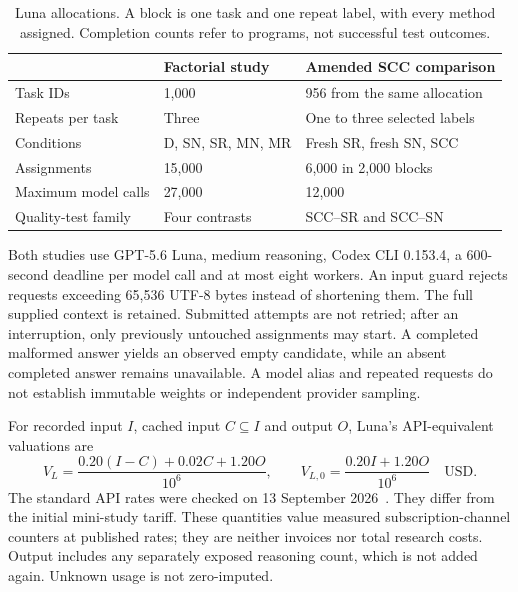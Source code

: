 \begin{table}[htbp]\centering\small
\caption{Luna allocations. A block is one task and one repeat label, with every method assigned. Completion counts refer to programs, not successful test outcomes.}
\begin{tabularx}{\textwidth}{@{}lXX@{}}\toprule
 & Factorial study & Amended SCC comparison\\\midrule
Task IDs & 1,000 & 956 from the same allocation\\
Repeats per task & Three & One to three selected labels\\
Conditions & D, SN, SR, MN, MR & Fresh SR, fresh SN, SCC\\
Assignments & 15,000 & 6,000 in 2,000 blocks\\
Maximum model calls & 27,000 & 12,000\\
Quality-test family & Four contrasts & SCC--SR and SCC--SN\\\bottomrule
\end{tabularx}\end{table}

Both studies use GPT-5.6 Luna, medium reasoning, Codex CLI 0.153.4, a 600-second deadline per model call and at most eight workers. An input guard rejects requests exceeding 65,536 UTF-8 bytes instead of shortening them. The full supplied context is retained. Submitted attempts are not retried; after an interruption, only previously untouched assignments may start. A completed malformed answer yields an observed empty candidate, while an absent completed answer remains unavailable. A model alias and repeated requests do not establish immutable weights or independent provider sampling.

For recorded input $I$, cached input $C\subseteq I$ and output $O$, Luna's API-equivalent valuations are
\[
V_L=\frac{0.20(I-C)+0.02C+1.20O}{10^6},\qquad
V_{L,0}=\frac{0.20I+1.20O}{10^6}\quad\mathrm{USD}.
\]
The standard API rates were checked on 13 September 2026~\cite{openaipricing2026}. They differ from the initial mini-study tariff. These quantities value measured subscription-channel counters at published rates; they are neither invoices nor total research costs. Output includes any separately exposed reasoning count, which is not added again. Unknown usage is not zero-imputed.

